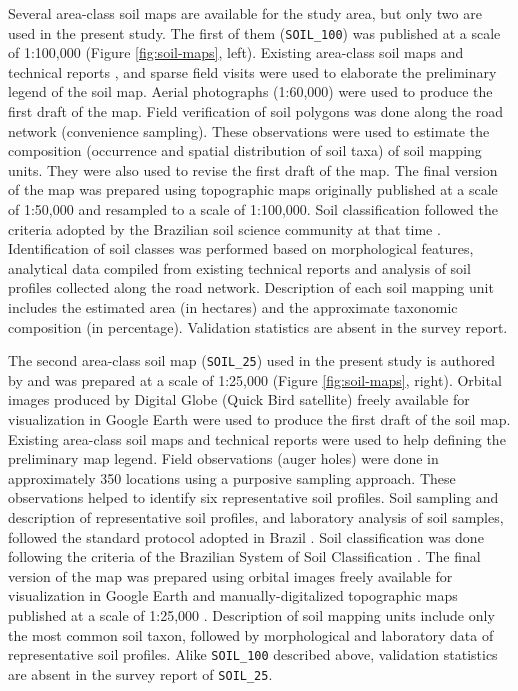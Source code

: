 Several area-class soil maps are available for the study area, but only two are used in the present study. The first of them (\texttt{SOIL\_100}) was published at a scale of 1:100,000 \citep{AzolinEtAl1988} (Figure \ref{fig:soil-maps}, left). Existing area-class soil maps and technical reports \cite{Brasil1973, Azolin1977, MacielEtAl1987a, MacielEtAl1987, AbraoEtAl1988}, and sparse field visits were used to elaborate the preliminary legend of the soil map. Aerial photographs (1:60,000) were used to produce the first draft of the map. Field verification of soil polygons was done along the road network (convenience sampling). These observations were used to estimate the composition (occurrence and spatial distribution of soil taxa) of soil mapping units. They were also used to revise the first draft of the map. The final version of the map was prepared using topographic maps originally published at a scale of 1:50,000 and resampled to a scale of 1:100,000. Soil classification followed the criteria adopted by the Brazilian soil science community at that time \citep{Brasil1973, CamargoEtAl1982, Carvalho1982, LemosEtAl1982, OlmosEtAl1982}. Identification of soil classes was performed based on morphological features, analytical data compiled from existing technical reports and analysis of soil profiles collected along the road network. Description of each soil mapping unit includes the estimated area (in hectares) and the approximate taxonomic composition (in percentage). Validation statistics are absent in the survey report.

The second area-class soil map (\texttt{SOIL\_25}) used in the present study is authored by \cite{Miguel2010} and was prepared at a scale of 1:25,000 (Figure \ref{fig:soil-maps}, right). Orbital images produced by Digital Globe\textregistered{} (Quick Bird satellite) freely available for visualization in Google Earth\textregistered{} were used to produce the first draft of the soil map. Existing area-class soil maps and technical reports \citep{Pedron2005, Poelking2007, Sturmer2008} were used to help defining the preliminary map legend. Field observations (auger holes) were done in approximately 350 locations using a purposive sampling approach. These observations helped to identify six representative soil profiles. Soil sampling and description of representative soil profiles, and laboratory analysis of soil samples, followed the standard protocol adopted in Brazil \citep{ClaessenEtAl1997, SantosEtAl2005}. Soil classification was done following the criteria of the Brazilian System of Soil Classification \citep{SantosEtAl2006}. The final version of the map was prepared using orbital images freely available for visualization in Google Earth\textregistered{} and manually-digitalized topographic maps published at a scale of 1:25,000 \citep{DSG1992a, DSG1992}. Description of soil mapping units include only the most common soil taxon, followed by morphological and laboratory data of representative soil profiles. Alike \texttt{SOIL\_100} described above, validation statistics are absent in the survey report of \texttt{SOIL\_25}.

